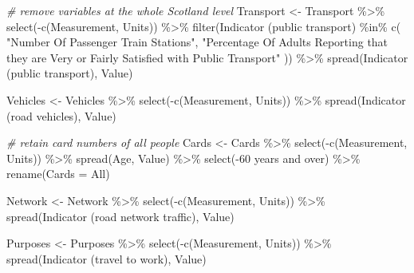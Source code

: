 \documentclass[
]{article}
\newenvironment{Shaded}{\begin{snugshade}}{\end{snugshade}}
\newcommand{\AttributeTok}[1]{\textcolor[rgb]{0.77,0.63,0.00}{#1}}
\newcommand{\CommentTok}[1]{\textcolor[rgb]{0.56,0.35,0.01}{\textit{#1}}}
\newcommand{\FunctionTok}[1]{\textcolor[rgb]{0.00,0.00,0.00}{#1}}
\newcommand{\NormalTok}[1]{#1}
\newcommand{\OtherTok}[1]{\textcolor[rgb]{0.56,0.35,0.01}{#1}}
\newcommand{\SpecialCharTok}[1]{\textcolor[rgb]{0.00,0.00,0.00}{#1}}
\newcommand{\StringTok}[1]{\textcolor[rgb]{0.31,0.60,0.02}{#1}}
\begin{document}
\begin{Shaded}
\begin{Highlighting}[]
\CommentTok{\# remove variables at the whole Scotland level}
\NormalTok{Transport }\OtherTok{\textless{}{-}}\NormalTok{ Transport }\SpecialCharTok{\%\textgreater{}\%}
  \FunctionTok{select}\NormalTok{(}\SpecialCharTok{{-}}\FunctionTok{c}\NormalTok{(Measurement, Units)) }\SpecialCharTok{\%\textgreater{}\%}
  \FunctionTok{filter}\NormalTok{(}\StringTok{\textasciigrave{}}\AttributeTok{Indicator (public transport)}\StringTok{\textasciigrave{}} \SpecialCharTok{\%in\%} \FunctionTok{c}\NormalTok{(}
    \StringTok{"Number Of Passenger Train Stations"}\NormalTok{,}
    \StringTok{"Percentage Of Adults Reporting that they are Very or Fairly Satisfied with Public Transport"}
\NormalTok{  )) }\SpecialCharTok{\%\textgreater{}\%}
  \FunctionTok{spread}\NormalTok{(}\StringTok{\textasciigrave{}}\AttributeTok{Indicator (public transport)}\StringTok{\textasciigrave{}}\NormalTok{, Value)}

\NormalTok{Vehicles }\OtherTok{\textless{}{-}}\NormalTok{ Vehicles }\SpecialCharTok{\%\textgreater{}\%}
  \FunctionTok{select}\NormalTok{(}\SpecialCharTok{{-}}\FunctionTok{c}\NormalTok{(Measurement, Units)) }\SpecialCharTok{\%\textgreater{}\%}
  \FunctionTok{spread}\NormalTok{(}\StringTok{\textasciigrave{}}\AttributeTok{Indicator (road vehicles)}\StringTok{\textasciigrave{}}\NormalTok{, Value)}

\CommentTok{\# retain card numbers of all people}
\NormalTok{Cards }\OtherTok{\textless{}{-}}\NormalTok{ Cards }\SpecialCharTok{\%\textgreater{}\%}
  \FunctionTok{select}\NormalTok{(}\SpecialCharTok{{-}}\FunctionTok{c}\NormalTok{(Measurement, Units)) }\SpecialCharTok{\%\textgreater{}\%}
  \FunctionTok{spread}\NormalTok{(Age, Value) }\SpecialCharTok{\%\textgreater{}\%}
  \FunctionTok{select}\NormalTok{(}\SpecialCharTok{{-}}\StringTok{\textasciigrave{}}\AttributeTok{60 years and over}\StringTok{\textasciigrave{}}\NormalTok{) }\SpecialCharTok{\%\textgreater{}\%}
  \FunctionTok{rename}\NormalTok{(}\AttributeTok{Cards =}\NormalTok{ All)}

\NormalTok{Network }\OtherTok{\textless{}{-}}\NormalTok{ Network }\SpecialCharTok{\%\textgreater{}\%}
  \FunctionTok{select}\NormalTok{(}\SpecialCharTok{{-}}\FunctionTok{c}\NormalTok{(Measurement, Units)) }\SpecialCharTok{\%\textgreater{}\%}
  \FunctionTok{spread}\NormalTok{(}\StringTok{\textasciigrave{}}\AttributeTok{Indicator (road network traffic)}\StringTok{\textasciigrave{}}\NormalTok{, Value)}

\NormalTok{Purposes }\OtherTok{\textless{}{-}}\NormalTok{ Purposes }\SpecialCharTok{\%\textgreater{}\%}
  \FunctionTok{select}\NormalTok{(}\SpecialCharTok{{-}}\FunctionTok{c}\NormalTok{(Measurement, Units)) }\SpecialCharTok{\%\textgreater{}\%}
  \FunctionTok{spread}\NormalTok{(}\StringTok{\textasciigrave{}}\AttributeTok{Indicator (travel to work)}\StringTok{\textasciigrave{}}\NormalTok{, Value)}


\end{Highlighting}
\end{Shaded}
\end{document}
